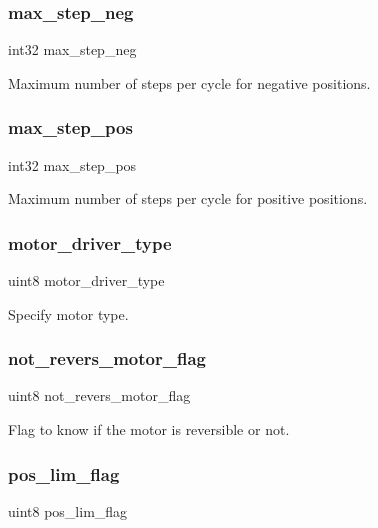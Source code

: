 \subsubsection{max\+\_\+step\+\_\+neg}
{\footnotesize\ttfamily int32 max\+\_\+step\+\_\+neg}

Maximum number of steps per cycle for negative positions. \mbox{\label{structst__motor_a9be5987152b8c6bb28c1d311bc94e5e3}} 
\subsubsection{max\+\_\+step\+\_\+pos}
{\footnotesize\ttfamily int32 max\+\_\+step\+\_\+pos}

Maximum number of steps per cycle for positive positions. \mbox{\label{structst__motor_ad7083e21e3e766d7e9cc5858b2e659cf}} 
\subsubsection{motor\+\_\+driver\+\_\+type}
{\footnotesize\ttfamily uint8 motor\+\_\+driver\+\_\+type}

Specify motor type. \mbox{\label{structst__motor_a6525eb3c16595104c1d0fbcf0a8d1de4}} 
\subsubsection{not\+\_\+revers\+\_\+motor\+\_\+flag}
{\footnotesize\ttfamily uint8 not\+\_\+revers\+\_\+motor\+\_\+flag}

Flag to know if the motor is reversible or not. \mbox{\label{structst__motor_aa2ceebf7546e978c8b0393ce8035532d}} 
\subsubsection{pos\+\_\+lim\+\_\+flag}
{\footnotesize\ttfamily uint8 pos\+\_\+lim\+\_\+flag}

